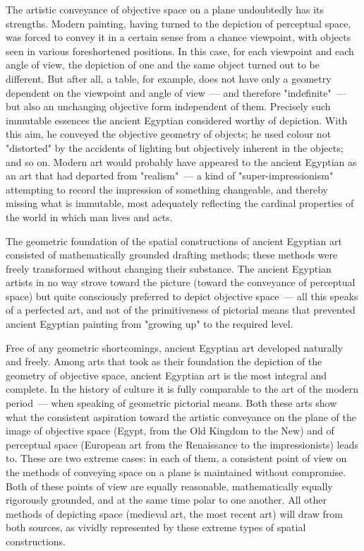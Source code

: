 The artistic conveyance of objective space on a plane undoubtedly has its strengths.
Modern painting, having turned to the depiction of perceptual space, was forced to
convey it in a certain sense from a chance viewpoint, with objects seen in various
foreshortened positions. In this case, for each viewpoint and each angle of view, the
depiction of one and the same object turned out to be different. But after all, a table,
for example, does not have only a geometry dependent on the viewpoint and angle of
view~--- and therefore "indefinite"~--- but also an unchanging objective form independent
of them. Precisely such immutable essences the ancient Egyptian considered worthy of
depiction. With this aim, he conveyed the objective geometry of objects; he used colour
not "distorted" by the accidents of lighting but objectively inherent in the objects; and
so on. Modern art would probably have appeared to the ancient Egyptian as an art that
had departed from "realism"~--- a kind of "super-impressionism" attempting to record
the impression of something changeable, and thereby missing what is immutable, most
adequately reflecting the cardinal properties of the world in which man lives and acts.


The geometric foundation of the spatial constructions of ancient Egyptian art consisted
of mathematically grounded drafting methods; these methods were freely transformed
without changing their substance. The ancient Egyptian artists in no way strove toward
the picture (toward the conveyance of perceptual space) but quite consciously preferred
to depict objective space~--- all this speaks of a perfected art, and not of the primitiveness
of pictorial means that prevented ancient Egyptian painting from "growing up" to the
required level.

Free of any geometric shortcomings, ancient Egyptian art developed naturally and
freely. Among arts that took as their foundation the depiction of the geometry of
objective space, ancient Egyptian art is the most integral and complete. In the history
of culture it is fully comparable to the art of the modern period~--- when speaking of
geometric pictorial means. Both these arts show what the consistent aspiration toward
the artistic conveyance on the plane of the image of objective space (Egypt, from the
Old Kingdom to the New) and of perceptual space (European art from the Renaissance
to the impressionists) leads to. These are two extreme cases: in each of them, a
consistent point of view on the methods of conveying space on a plane is maintained
without compromise. Both of these points of view are equally reasonable, mathematically
equally rigorously grounded, and at the same time polar to one another. All other
methods of depicting space (medieval art, the most recent art) will draw from both
sources, as vividly represented by these extreme types of spatial constructions.


